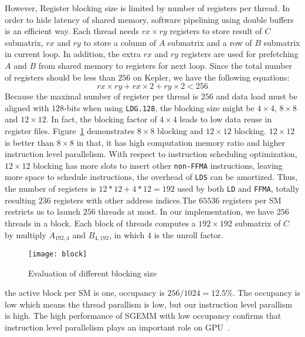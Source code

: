 However, Register blocking size is limited by number of registers per thread. 
In order to hide latency of shared memory, software pipelining using double
buffers is an efficient way. Each thread needs $rx\times ry$ registers to store result of $C$ submatrix, $rx$ and $ry$ to store a column of $A$
submatrix and a row of $B$ submatrix in current loop. In addition, the extra $rx$ and $ry$ registers are used for prefetching $A$ and $B$ from shared memory to
registers for next loop. Since the total number of registers should be less than $256$ on Kepler, we have the following equations:
\begin{equation}
    rx\times ry + rx\times 2 + ry\times 2 < 256
\label{f_register}
\end{equation}
Because the maximal number of register per thread is $256$ and data load must be aligned with $128$-bits when using {\tt LDG.128}, the blocking size might be $4\times 4$, $8\times 8$ and $12\times 12$. In fact, the blocking factor of $4\times 4$ leads to low data reuse in register files. Figure~\ref{fig:block} demonstrates $8\times8$ blocking and $12\times12$ blocking. $12\times12$ is better than
$8\times8$ in that, it has high computation memory ratio and higher instruction level parallelism. With respect to instruction scheduling optimization, $12\times12$ blocking has more slots to insert other {\tt non-FFMA} instructions, leaving more
space to schedule instructions, the overhead of {\tt LDS} can be amortized. Thus, the number of registers is $12*12+4*12=192$ used by both {\tt LD} and {\tt FFMA}, totally resulting $236$ registers with other address indices.The $65536$ registers per SM restricts us to launch $256$ threads at most. In our implementation, we have $256$ threads in a block. Each block of threads computes a $192\times 192$ submatrix of $C$ by multiply $A_{192,4}$ and $B_{4, 192}$, in which $4$ is the unroll factor.

\begin{figure}[htbp]
\begin{center}
\texttt{[image: block]}
    \caption{Evaluation of different blocking size}
\label{fig:block}
\end{center}
\end{figure}
the active block per SM is one, occupancy is $256/1024=12.5\%$.
The occupancy is low which means the thread parallism is low, but our instruction level parallism is high. The high performance of SGEMM with low occupancy confirms that instruction level parallelism plays an important role on GPU~\cite{volkov2010better}.

